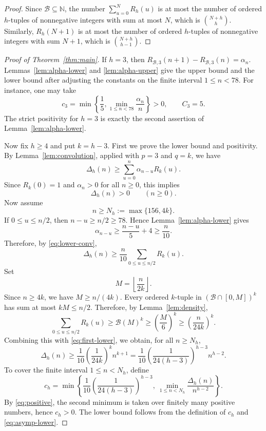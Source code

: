 \documentclass[11pt]{amsart}
\theoremstyle{remark}
\theoremstyle{plain}
\newcommand{\BaseB}{\mathcal B}
\begin{document}
\begin{proof}
Since $\BaseB\subseteq \mathbb N$, the number $\sum_{u=0}^N R_h(u)$ is at most the number of ordered $h$-tuples of nonnegative integers with sum at most $N$, which is $\binom{N+h}{h}$. Similarly, $R_h(N+1)$ is at most the number of ordered $h$-tuples of nonnegative integers with sum $N+1$, which is $\binom{N+h}{h-1}$.
\end{proof}

\begin{proof}[Proof of Theorem~\ref{thm:main}]
If $h=3$, then \(R_{\BaseB,3}(n+1)-R_{\BaseB,3}(n)=\alpha_n\). Lemmas~\ref{lem:alpha-lower} and \ref{lem:alpha-upper} give the upper bound and the lower bound after adjusting the constants on the finite interval $1\le n<78$. For instance, one may take
\[
c_3=\min\left\{\frac15,\min_{1\le n<78}\frac{\alpha_n}{n}\right\}>0,
\qquad C_3=5.
\]
The strict positivity for $h=3$ is exactly the second assertion of Lemma~\ref{lem:alpha-lower}.

Now fix $h\ge 4$ and put $k=h-3$.
First we prove the lower bound and positivity. By Lemma~\ref{lem:convolution}, applied with $p=3$ and $q=k$, we have
\begin{equation}\label{eq:lower-conv}
\Delta_h(n)\ge \sum_{u=0}^n \alpha_{n-u}R_k(u).
\end{equation}
Since $R_k(0)=1$ and $\alpha_n>0$ for all $n\ge 0$, this implies
\begin{equation}\label{eq:positive}
\Delta_h(n)>0\qquad (n\ge 0).
\end{equation}
Now assume
\[
n\ge N_h:=\max\{156,4k\}.
\]
If $0\le u\le n/2$, then $n-u\ge n/2\ge 78$. Hence Lemma~\ref{lem:alpha-lower} gives
\[
\alpha_{n-u}\ge \frac{n-u}{5}+4\ge \frac n{10}.
\]
Therefore, by \eqref{eq:lower-conv},
\begin{equation}\label{eq:first-lower}
\Delta_h(n)\ge \frac n{10}\sum_{0\le u\le n/2}R_k(u).
\end{equation}
Set
\[
M=\left\lfloor\frac n{2k}\right\rfloor.
\]
Since $n\ge 4k$, we have $M\ge n/(4k)$. Every ordered $k$-tuple in $(\BaseB\cap[0,M])^k$ has sum at most $kM\le n/2$. Therefore, by Lemma~\ref{lem:density},
\[
\sum_{0\le u\le n/2}R_k(u)\ge  \BaseB (M)^k\ge \left(\frac M6\right)^k\ge \left(\frac n{24k}\right)^k.
\]
Combining this with \eqref{eq:first-lower}, we obtain, for all $n\ge N_h$,
\begin{equation}\label{eq:asymp-lower}
\Delta_h(n)\ge \frac1{10}\left(\frac1{24k}\right)^k n^{k+1}=\frac1{10}\left(\frac1{24(h-3)}\right)^{h-3}n^{h-2}.
\end{equation}
To cover the finite interval $1\le n<N_h$, define
\[
c_h=\min\left\{\frac1{10}\left(\frac1{24(h-3)}\right)^{h-3},\ \min_{1\le n<N_h}\frac{\Delta_h(n)}{n^{h-2}}\right\}.
\]
By \eqref{eq:positive}, the second minimum is taken over finitely many positive numbers, hence $c_h>0$. The lower bound follows from the definition of $c_h$ and \eqref{eq:asymp-lower}.


\end{proof}
\end{document}
